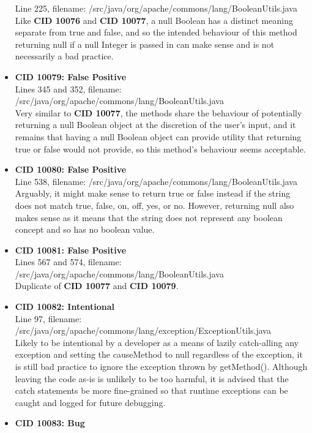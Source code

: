 \documentclass{article}
\begin{document}
\begin{itemize}
    Line 225, filename: /src/java/org/apache/commons/lang/BooleanUtils.java \\
    Like \textbf{CID 10076} and \textbf{CID 10077}, a null Boolean has a distinct meaning separate from true and false, and 
    so the intended behaviour of this method returning null if a null Integer is passed in can make sense and is not 
    necessarily a bad practice.
\item \textbf{CID 10079: False Positive} \\
    Lines 345 and 352, filename: /src/java/org/apache/commons/lang/BooleanUtils.java \\
    Very similar to \textbf{CID 10077}, the methods share the behaviour of potentially returning a null Boolean object
    at the discretion of the user's input, and it remains that having a null Boolean object can provide utility that
    returning true or false would not provide, so this method's behaviour seems acceptable.
\item \textbf{CID 10080: False Positive} \\
    Line 538, filename: /src/java/org/apache/commons/lang/BooleanUtils.java \\
    Arguably, it might make sense to return true or false instead if the string does not match true, false, 
    on, off, yes, or no. However, returning null also makes sense as it means that the string does not represent
    any boolean concept and so has no boolean value.
\item \textbf{CID 10081: False Positive} \\
    Lines 567 and 574, filename: /src/java/org/apache/commons/lang/BooleanUtils.java \\
    Duplicate of \textbf{CID 10077} and \textbf{CID 10079}.
\item \textbf{CID 10082: Intentional} \\
    Line 97, filename: /src/java/org/apache/commons/lang/exception/ExceptionUtils.java \\
    Likely to be intentional by a developer as a means of lazily catch-alling any exception and setting the causeMethod
    to null regardless of the exception, it is still bad practice to ignore the exception thrown by getMethod(). Although
    leaving the code as-is is unlikely to be too harmful, it is advised that the catch statements be more fine-grained so that 
    runtime exceptions can be caught and logged for future debugging.
\item \textbf{CID 10083: Bug} \\

\end{itemize}
\end{document}

